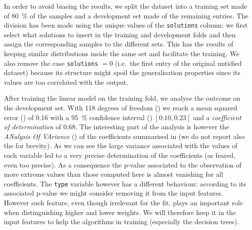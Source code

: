 In order to avoid biasing the results, we split the dataset into a training set made of \SI{80}{\percent} of the samples and a development set made of the remaining entries.
The division has been made using the unique values of the \texttt{solutions} column: we first select what solutions to insert in the training and development folds and then assign the corresponding samples to the different sets.
This has the results of keeping similar distributions inside the same set and facilitate the training.\footnotemark{}
We also remove the case \texttt{solutions} $= 0$ (i.e.\ the first entry of the original untidied dataset) because its structure might spoil the generalisation properties since its values are too correlated with the output.

After training the linear model on the training fold, we analyse the outcome on the development set.
With 118 degrees of freedom (\dof) we reach a mean squared error (\mse) of \num{0.16} with a \SI{95}{\percent} confidence interval (\ci) $[0.10, 0.23]$ and a \emph{coefficient of determination} \rr of \num{0.68}.
The interesting part of the analysis is however the \emph{ANalysis Of VAriance} (\anova) of the coefficients summarised in  (we do not report also the \ci for brevity).
As we can see the large variance associated with the values of each variable led to a very precise determination of the coefficients (as feared, even too precise).
As a consequence the p-value associated to the observation of more extreme values than those computed here is almost vanishing for all coefficients.
The \texttt{type} variable however has a different behaviour: according to its associated p-value we might consider removing it from the input features.
However such feature, even though irrelevant for the fit, plays an important role when distinguishing higher and lower weights.
We will therefore keep it in the input features to help the algorithms in training (especially the decision trees).\footnotemark{}

